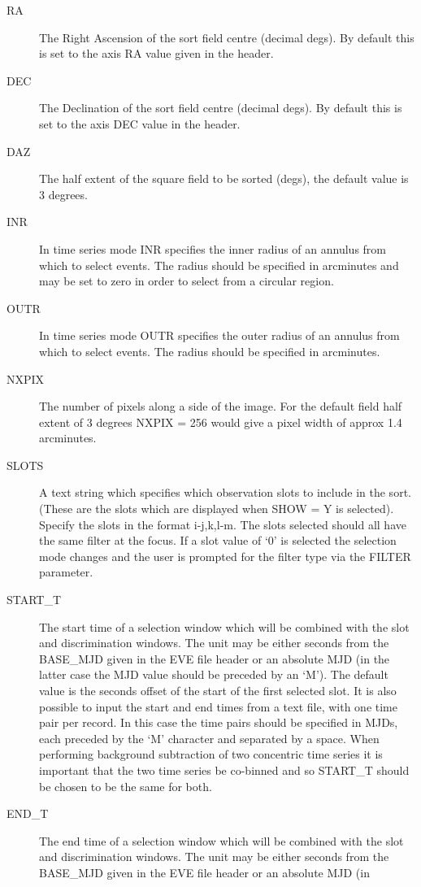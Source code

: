 \begin{description}
\item[RA]
The Right Ascension of the sort field centre (decimal degs). By default this
is set to the axis RA value  given in the header.
\item[DEC]
The Declination of the sort field centre (decimal degs). By default this
is set to the axis DEC value in the header.
\item[DAZ]
The half extent of the square field to be sorted (degs), 
the default value is 3 degrees.
\item[INR]
In time series mode INR specifies the inner radius of an annulus
from which to select events. The radius should be specified in arcminutes
and may be set to zero in order to select from a circular region.
\item[OUTR]
In time series mode OUTR specifies the outer radius of an annulus
from which to select events. The radius should be specified in arcminutes.
\item[NXPIX]
The number of pixels along a side of the image. For the default field half
extent of 3 degrees NXPIX = 256 
would give a pixel width of approx 1.4 arcminutes.
\item[SLOTS]
A text string which specifies which observation slots to include in
the sort. (These are the slots which are displayed when SHOW = Y is selected).
Specify the slots in the format i-j,k,l-m. The slots selected
should all have the same filter at the focus. If a slot value of `0' is
selected the selection mode changes and the user is prompted for the 
filter type via the FILTER parameter.
\item[START\_T]
The start time of a selection window which will be combined with
the slot and discrimination windows. The unit may be either seconds
from the BASE\_MJD given in the EVE file header or an absolute MJD
(in the latter case the MJD value should be preceded by an `M').
The default value is the seconds offset of the start of the first selected slot. 
It is also possible to input the start and end times from a text file,
with one time pair per record. In this case the time pairs should be
specified in MJDs, each preceded by the `M' character and separated by
a space. When performing background subtraction of two concentric time
series it is important that the two time series be co-binned and so 
START\_T should be chosen to be the same for both.
\item[END\_T ]
The end time of a selection window which will be combined with
the slot and discrimination windows. The unit may be either seconds 
from the BASE\_MJD given in the EVE file header or an absolute MJD (in 

\end{description}
